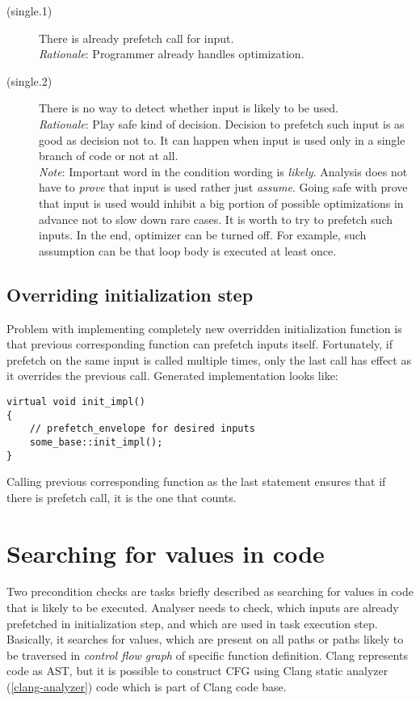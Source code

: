 \begin{description}
\item[(single.1)]{There is already prefetch call for input.\\
\emph{Rationale}: Programmer already handles optimization.
}

\item[(single.2)]{There is no way to detect whether input is likely to be used.\\
\emph{Rationale}: Play safe kind of decision. Decision to prefetch such input is as good as decision not to. It can happen when input is used only in a single branch of code or not at all.\\
\emph{Note}: Important word in the condition wording is \emph{likely}. Analysis does not have to \emph{prove} that input is used rather just \emph{assume}. Going safe with prove that input is used would inhibit a big portion of possible optimizations in advance not to slow down rare cases. It is worth to try to prefetch such inputs. In the end, optimizer can be turned off. For example, such assumption can be that loop body is executed at least once.
}
\end{description}

\subsection{Overriding initialization step}
Problem with implementing completely new overridden initialization function is that previous corresponding function can prefetch inputs itself. Fortunately, if prefetch on the same input is called multiple times, only the last call has effect as it overrides the previous call. Generated implementation looks like:

\begin{lstlisting}[caption={Generated box initialization function definition.}]
virtual void init_impl()
{
    // prefetch_envelope for desired inputs
    some_base::init_impl();
}
\end{lstlisting}

Calling previous corresponding  function as the last statement ensures that if there is prefetch call, it is the one that counts.

\section{Searching for values in code}
Two precondition checks are tasks briefly described as searching for values in code that is likely to be executed. Analyser needs to check, which inputs are already prefetched in initialization step, and which are used in task execution step. Basically, it searches for values, which are present on all paths or paths likely to be traversed in \emph{control flow graph} of specific function definition. Clang represents code as AST, but it is possible to construct CFG using Clang static analyzer (\ref{clang-analyzer}) code which is part of Clang code base.

